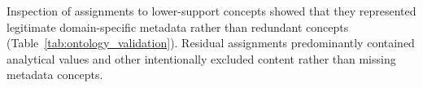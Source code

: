 \documentclass{article}
\begin{document}
\begin{table}[!ht]
    \centering
    \caption{Metadata concepts with the highest and lowest snapshot support.}
    \label{tab:ontology_frequency}
\end{table}

Inspection of assignments to lower-support concepts showed that they represented legitimate domain-specific metadata rather than redundant concepts (Table~\ref{tab:ontology_validation}). Residual assignments predominantly contained analytical values and other intentionally excluded content rather than missing metadata concepts.
\end{document}
